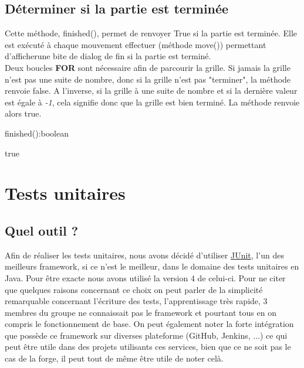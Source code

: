 		\subsection{Déterminer si la partie est terminée}

			Cette méthode, finished(), permet de renvoyer True si la partie est terminée. Elle est exécuté à chaque mouvement effectuer (méthode move()) permettant d'afficherune bite de dialog de fin si la partie est terminé.\\
			Deux boucles \textbf{FOR} sont nécessaire afin de parcourir la grille. Si jamais la grille n'est pas une suite de nombre, donc si la grille n'est pas "terminer", la méthode renvoie false. A l'inverse, si la grille à une suite de nombre et si la dernière valeur est égale à \textit{-1}, cela signifie donc que la grille est bien terminé. La méthode renvoie alors true.\\

			\begin{algorithm}[H]
				\caption{finished():boolean}
				\Return true
			\end{algorithm}



	\section{Tests unitaires}

		\subsection{Quel outil ?}

			Afin de réaliser les tests unitaires, nous avons décidé d'utiliser \href{https://junit.org/junit4/}{JUnit}, l'un des meilleurs framework, si ce n'est le meilleur, dans le domaine des tests unitaires en Java. Pour être exacte nous avons utilisé la version 4 de celui-ci. Pour ne citer que quelques raisons concernant ce choix on peut parler de la simplicité remarquable concernant l'écriture des tests, l'apprentissage très rapide, 3 membres du groupe ne connaissait pas le framework et pourtant tous en on compris le fonctionnement de base. On peut également noter la forte intégration que possède ce framework sur diverses plateforme (GitHub, Jenkins, ...) ce qui peut être utile dans des projets utilisants ces services, bien que ce ne soit pas le cas de la forge, il peut tout de même être utile de noter celà.


